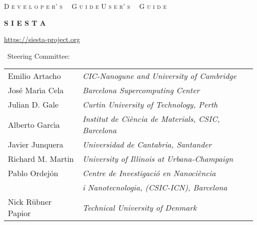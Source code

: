 \begin{titlepage}

\begin{center}

\vspace{1cm}
\ifdeveloper
 {\Huge \textsc{D e v e l o p e r' s \, \, G u i d e}}
\else
 {\Huge \textsc{U s e r' s \, \, G u i d e}}
\fi

\vspace{1cm}
\hrulefill
\vspace{1cm}

{\Huge \textbf{S I E S T A \, \, \softwareversion}}

\vspace{1cm}
\hrulefill
\vspace{0.5cm}

{\Large \printdate}

\vspace{1.5cm}
{\Large \url{https://siesta-project.org}}

\vspace{2.5cm}
\siesta\ Steering Committee:
\vspace{1.0cm}

\begin{tabular}{ll}
  
  Emilio Artacho &
  \textit{CIC-Nanogune and University of Cambridge} \\
  
  Jos\'e Mar\'{\i}a Cela &
  \textit{Barcelona Supercomputing Center} \\
  
  Julian D. Gale &
  \textit{Curtin University of Technology, Perth} \\
  
  Alberto Garc\'{\i}a &
  \textit{Institut de Ci\`encia de Materials, CSIC, Barcelona} \\

  Javier Junquera &
  \textit{Universidad de Cantabria, Santander} \\

  Richard M. Martin &
  \textit{University of Illinois at Urbana-Champaign} \\

  Pablo Ordej\'on &
  \textit{Centre de Investigaci\'o en Nanoci\`encia} \\
  &
  \textit{  i Nanotecnologia, (CSIC-ICN), Barcelona} \\
  
  Nick R\"ubner Papior &
  \textit{Technical University of Denmark} \\
  

\end{tabular}
\end{center}
\end{titlepage}
